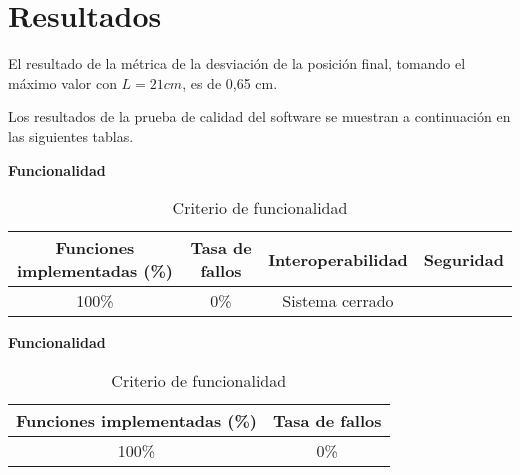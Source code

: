 \section{Resultados}

El resultado de la métrica de la desviación de la posición final, tomando el máximo valor con $L = 21 cm$, es de 0,65 cm.

Los resultados de la prueba de calidad del software se muestran a continuación en las siguientes tablas.

\textbf{Funcionalidad}

\begin{table}[ht]
	\centering
	\begin{tabular}{|c|c|c|c|}
		\hline
		\textbf{Funciones implementadas (\%)} & \textbf{Tasa de fallos} & \textbf{Interoperabilidad} & \textbf{Seguridad} \\
		\hline
		100\% & 0\% & Sistema cerrado &  \\
		\hline
	\end{tabular}
	\caption{Criterio de funcionalidad}
	\label{tab:Resultados}
\end{table}

\textbf{Funcionalidad}

\begin{table}[ht]
	\centering
	\begin{tabular}{|c|c|}
		\hline
		\textbf{Funciones implementadas (\%)} & \textbf{Tasa de fallos} \\
		\hline
		100\% & 0\% \\
		\hline
	\end{tabular}
	\caption{Criterio de funcionalidad}
	\label{tab:Resultados}
\end{table}
